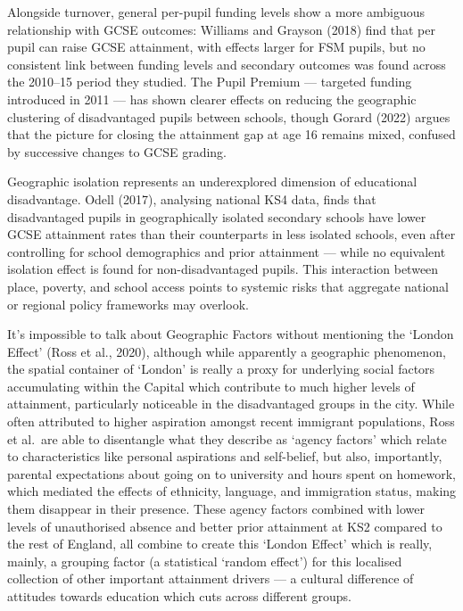 \documentclass[
  11pt,
]{article}
\begin{document}
Alongside turnover, general per-pupil funding levels show a more
ambiguous relationship with GCSE outcomes: Williams and Grayson (2018)
find that per pupil can raise GCSE attainment, with effects larger for
FSM pupils, but no consistent link between funding levels and secondary
outcomes was found across the 2010--15 period they studied. The Pupil
Premium --- targeted funding introduced in 2011 --- has shown clearer
effects on reducing the geographic clustering of disadvantaged pupils
between schools, though Gorard (2022) argues that the picture for
closing the attainment gap at age 16 remains mixed, confused by
successive changes to GCSE grading.

Geographic isolation represents an underexplored dimension of
educational disadvantage. Odell (2017), analysing national KS4 data,
finds that disadvantaged pupils in geographically isolated secondary
schools have lower GCSE attainment rates than their counterparts in less
isolated schools, even after controlling for school demographics and
prior attainment --- while no equivalent isolation effect is found for
non-disadvantaged pupils. This interaction between place, poverty, and
school access points to systemic risks that aggregate national or
regional policy frameworks may overlook.

It's impossible to talk about Geographic Factors without mentioning the
`London Effect' (Ross et al., 2020), although while apparently a
geographic phenomenon, the spatial container of `London' is really a
proxy for underlying social factors accumulating within the Capital
which contribute to much higher levels of attainment, particularly
noticeable in the disadvantaged groups in the city. While often
attributed to higher aspiration amongst recent immigrant populations,
Ross et al.~are able to disentangle what they describe as `agency
factors' which relate to characteristics like personal aspirations and
self-belief, but also, importantly, parental expectations about going on
to university and hours spent on homework, which mediated the effects of
ethnicity, language, and immigration status, making them disappear in
their presence. These agency factors combined with lower levels of
unauthorised absence and better prior attainment at KS2 compared to the
rest of England, all combine to create this `London Effect' which is
really, mainly, a grouping factor (a statistical `random effect') for
this localised collection of other important attainment drivers --- a
cultural difference of attitudes towards education which cuts across
different groups.
\end{document}
